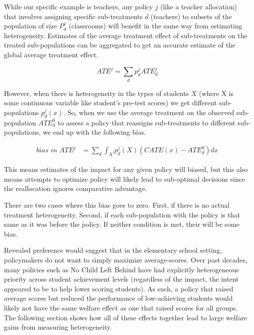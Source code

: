 \documentclass[12pt]{article}
\theoremstyle{definition}
\theoremstyle{definition}
\theoremstyle{definition}
\theoremstyle{definition}
\begin{document}
    While our specific example is teachers, any  policy $j$ (like a teacher allocation) that involves assigning specific sub-treatments $d$ (teachers) to subsets of the population of size $P^j_d$ (classrooms) will benefit in the same way from estimating heterogeneity. Estimates of the average treatment effect of sub-treatments on the treated sub-populations can be aggregated to get an accurate estimate of the global average treatment effect. 

    \begin{equation}
       ATE^j = \sum_d p^j_d ATE^j_d
    \end{equation}  

    However, when there is heterogeneity in the types of students $X$ (where X is some continuous variable like student's pre-test scores) we get different sub-populations $p^j_d(x)$. So, when we use the average treatment on the observed sub-population $ATE^0_d$ to assess a policy that reassigns sub-treatments to different sub-populations, we end up with the following bias. 

    \begin{equation}
    \begin{aligned}
    \textit{bias in } ATE^{j} 
    & = \sum_d  \int_X p^j_d(X) (CATE(x) - ATE^0_d) dx
    \end{aligned}
    \end{equation} 

    This means estimates of the impact for any given policy will biased, but this also means attempts to optimize policy will likely lead to sub-optimal decisions since the reallocation ignores comparative advantage. 

    There are two cases where this bias goes to zero. First, if there is no actual treatment heterogeneity. Second, if each sub-population with the policy is that same as it was before the policy. If neither condition is met, their will be some bias.
    
    Revealed preference would suggest that in the elementary school setting, policymakers do not want to simply maximize average-scores. Over past decades, many policies such as No Child Left Behind have had explicitly heterogeneous priority across student achievement levels (regardless of the impact, the intent appeared to be to help lower scoring students). As such, a policy that raised average scores but reduced the performance of low-achieving students would likely not have the same welfare effect as one that raised scores for all groups. The following section shows how all of these effects together lead to large welfare gains from measuring heterogeneity. 
\end{document}
